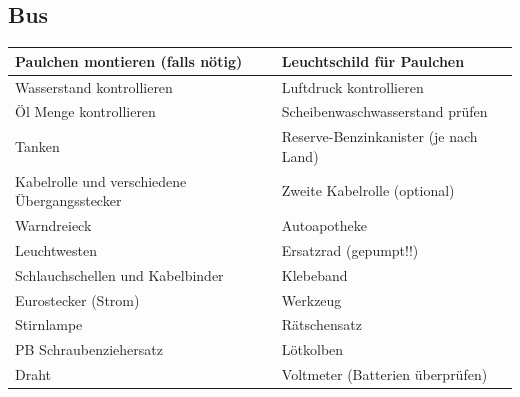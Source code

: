 \subsection{Bus}
\begin{center}
\begin{tabular}{|p{5cm}|p{5cm}|}\hline
Paulchen montieren (falls nötig) & Leuchtschild für Paulchen \\ \hline
Wasserstand kontrollieren & Luftdruck kontrollieren \\ \hline
Öl Menge kontrollieren & Scheibenwaschwasserstand prüfen \\ \hline
Tanken & Reserve-Benzinkanister (je nach Land) \\ \hline
Kabelrolle und verschiedene Übergangsstecker & Zweite Kabelrolle (optional) \\ \hline
Warndreieck & Autoapotheke \\ \hline
Leuchtwesten & Ersatzrad (gepumpt!!) \\ \hline
Schlauchschellen und Kabelbinder & Klebeband \\ \hline
Eurostecker (Strom) & Werkzeug \\ \hline
Stirnlampe & Rätschensatz \\ \hline
PB Schraubenziehersatz & Lötkolben \\ \hline
Draht & Voltmeter (Batterien überprüfen) \\ \hline
\end{tabular}
\end{center}




